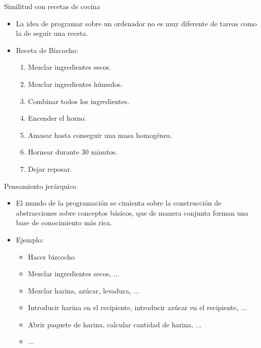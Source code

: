 \documentclass{beamer}
\begin{document}
    \begin{frame}{Similitud con recetas de cocina}
        \noindent
        \begin{minipage}{.29\textwidth}
          \begin{center}
            \fontsize{40}{50}
          \end{center}
        \end{minipage}
        \begin{minipage}{.69\textwidth}
            \begin{itemize}
                \item La idea de programar sobre un ordenador no es muy diferente de tareas como la de seguir una receta.
                \item Receta de Bizcocho:
                \begin{enumerate}
                    \item Mezclar ingredientes secos.
                    \item Mezclar ingredientes húmedos.
                    \item Combinar todos los ingredientes.
                    \item Encender el horno.
                    \item Amasar hasta conseguir una masa homogénea.
                    \item Hornear durante 30 minutos.
                    \item Dejar reposar.
                \end{enumerate}
            \end{itemize}
        \end{minipage}
    \end{frame}

    \begin{frame}{Pensamiento jerárquico}
        \begin{itemize}
          \item El mundo de la programación se cimienta sobre la construcción de abstracciones sobre conceptos básicos, que de manera conjunta forman una base de conocimiento más rica.
          \item Ejemplo:
          \begin{itemize}
            \item Hacer bizcocho
            \item Mezclar ingredientes secos, ...
            \item Mezclar harina, azúcar, levadura, ...
            \item Introducir harina en el recipiente, introducir azúcar en el recipiente, ...
            \item Abrir paquete de harina, calcular cantidad de harina, ...
            \item ...
          \end{itemize}
        \end{itemize}
    \end{frame}
\end{document}
